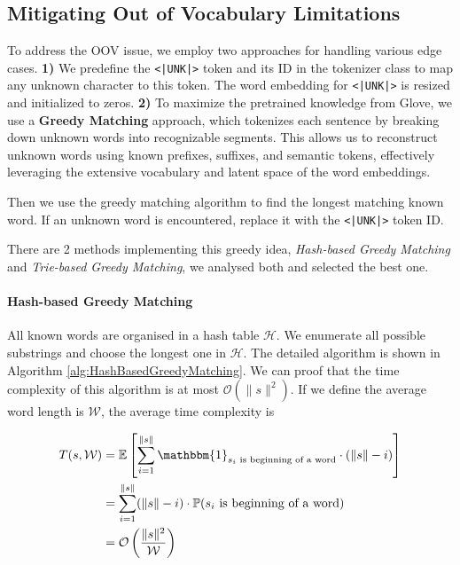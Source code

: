 \subsection{Mitigating Out of Vocabulary Limitations}
To address the OOV issue, we employ two approaches for handling various edge cases. \textbf{1)} We predefine the \texttt{<|UNK|>} token and its ID in the tokenizer class to map any unknown character to this token. The word embedding for \texttt{<|UNK|>} is resized and initialized to zeros. \textbf{2)} To maximize the pretrained knowledge from Glove, we use a \textbf{Greedy Matching} approach, which tokenizes each sentence by breaking down unknown words into recognizable segments. This allows us to reconstruct unknown words using known prefixes, suffixes, and semantic tokens, effectively leveraging the extensive vocabulary and latent space of the word embeddings.


Then we use the greedy matching algorithm to find the longest matching known word. If an unknown word is encountered, replace it with the \texttt{<|UNK|>} token ID.

There are 2 methods implementing this greedy idea, \textit{Hash-based Greedy Matching} and \textit{Trie-based Greedy Matching}, we analysed both and selected the best one.

\paragraph{Hash-based Greedy Matching} All known words are organised in a hash table $\mathcal{H}$. We enumerate all possible substrings and choose the longest one in $\mathcal{H}$. The detailed algorithm is shown in Algorithm \ref{alg:HashBasedGreedyMatching}. We can proof that the time complexity of this algorithm is at most $\mathcal{O}\left(\|s\|^2\right)$. If we define the average word length is $\mathcal{W}$, the average time complexity is

\begin{equation}
\begin{aligned}
T(s, \mathcal{W}) &= \mathbb{E}\left[\sum_{i=1}^{\|s\|}\mathbbm{1}_{s_i\text{ is beginning of a word}}\cdot (\|s\| - i)\right]\\
&=\sum_{i=1}^{\|s\|}(\|s\| - i)\cdot\mathbb{P}(s_i\text{ is beginning of a word})\\
&=\mathcal{O}\left(\frac{\|s\|^2}{\mathcal{W}}\right)
\end{aligned}
\end{equation}

